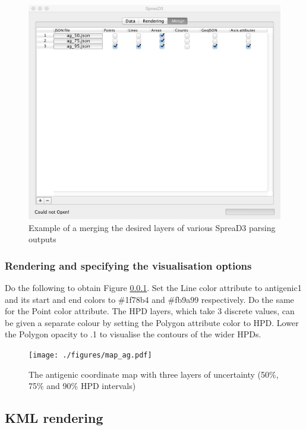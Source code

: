 \documentclass[english]{paper}
\begin{document}
\begin{figure}[!H]
\centering
\includegraphics[width=1\textwidth]{./figures/merge_ag.pdf} 
\caption{Example of a merging the desired layers of various SpreaD3 parsing outputs}
\label{fig:mergeTipsTricks}
\end{figure}

\subsubsection{Rendering and specifying the visualisation options}

Do the following to obtain Figure \ref{}.
Set the Line color attribute to antigenic1 and its start and end colors to \#1f78b4 and \#fb9a99 respectively. 
Do the same for the Point color attribute.
The HPD layers, which take 3 discrete values, can be given a separate colour by setting the Polygon attribute color to HPD.
Lower the Polygon opacity to .1 to visualise the contours of the wider HPDs.

\begin{figure}[!H]
\centering
\texttt{[image: ./figures/map\_ag.pdf]} 
\caption{The antigenic coordinate map with three layers of uncertainty (50\%, 75\% and 90\% HPD intervals)}
\label{fig:mergeTipsTricks}
\end{figure}


\subsection{KML rendering}
\label{kmlRender}
\end{document}
